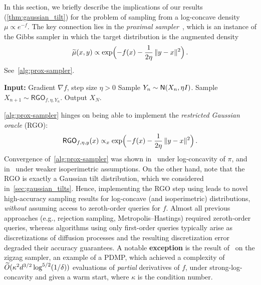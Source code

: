 In this section, we briefly describe the implications of our results (\cref{thm:gaussian_tilt}) for the problem of sampling from a log-concave density $\mu \propto e^{-f}$.
The key connection lies in the \emph{proximal sampler}~\citep{LeeSheTia21RGO, Chen+22ProxSampler}, which is an instance of the Gibbs sampler in which the target distribution is the augmented density
\begin{align*}
    \wt\mu(x,y)\propto \exp\prn[\Big]{-f(x) - \frac{1}{2\eta}\,\nrm{y-x}^2}\,.
\end{align*}
See~\cref{alg:prox-sampler}.

\begin{algorithm}
\caption{Proximal sampler}\label{alg:prox-sampler}
\begin{algorithmic}
\STATE \textbf{Input:} Gradient $\nabla f$, step size $\eta > 0$
\STATE Sample $Y_n \sim \normal{X_n, \eta I}$.
\STATE Sample $X_{n+1}\sim \mathsf{RGO}_{f,\eta,Y_n}$.
\ENDFOR
\STATE Output $X_N$.
\end{algorithmic}
\end{algorithm}

\cref{alg:prox-sampler} hinges on being able to implement the \emph{restricted Gaussian oracle} (RGO):
\begin{align*}
    \mathsf{RGO}_{f,\eta,y}(x)     \propto_x \exp\prn[\Big]{-f(x) - \frac{1}{2\eta}\,\nrm{y-x}^2}\,.
\end{align*}
Convergence of~\cref{alg:prox-sampler} was shown in~\citet{LeeSheTia21RGO} under log-concavity of $\pi$, and in~\citet{Chen+22ProxSampler} under weaker isoperimetric assumptions.
On the other hand, note that the RGO is exactly a Gaussian tilt distribution, which we considered in~\cref{sec:gaussian_tilts}.
Hence, implementing the RGO step using \AlgWSC{} leads to novel high-accuracy sampling results for log-concave (and isoperimetric) distributions, \emph{without} assuming access to zeroth-order queries for $f$.
Almost all previous approaches (e.g., rejection sampling, Metropolis--Hastings) required zeroth-order queries, whereas algorithms using only first-order queries typically arise as discretizations of diffusion processes and the resulting discretization error degraded their accuracy guarantees.
A notable \textbf{exception} is the result of~\citet{LuWan22Zigzag} on the zigzag sampler, an example of a PDMP\@, which achieved a complexity of $\wt O(\kappa^2 d^{3/2} \log^{5/2}(1/\delta))$ evaluations of \emph{partial} derivatives of $f$, under strong-log-concavity and given a warm start, where $\kappa$ is the condition number. %

